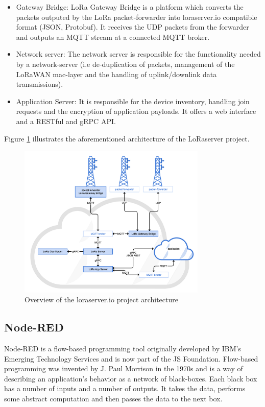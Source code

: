 \begin{itemize}
    \item Gateway Bridge: LoRa Gateway Bridge is a platform which converts the packets outputed by the LoRa packet-forwarder into loraserver.io compatible format (JSON, Protobuf). It receives the UDP packets from the forwarder and outputs an MQTT stream at a connected MQTT broker.
    \item Network server: The network server is responsible for the functionality needed by a network-server (i.e de-duplication of packets, management of the LoRaWAN mac-layer and the handling of uplink/downlink data transmissions).
    \item Application Server: It is responsible for the device inventory, handling join requests and the encryption of application payloads. It offers a web interface and a RESTful and gRPC API.

\end{itemize}
Figure \ref{fig:LoRaserver} illustrates the aforementioned architecture of the LoRaserver project.

\begin{figure}[h]
    \centering
    \includegraphics[width=0.8\textwidth]{images/loraserver-arch.png}
    \caption{Overview of the loraserver.io project architecture \cite{loraserver}}
    \label{fig:LoRaserver}
\end{figure}

\subsection{Node-RED}
Node-RED\cite{nodered} is a flow-based programming tool originally developed by IBM’s Emerging Technology Services and is now part of the JS Foundation. Flow-based programming was invented by J. Paul Morrison in the 1970s and is a way of describing an application’s behavior as a network of black-boxes. Each black box has a number of inputs and a number of outputs. It takes the data, performs some abstract computation and then passes the data to the next box.

